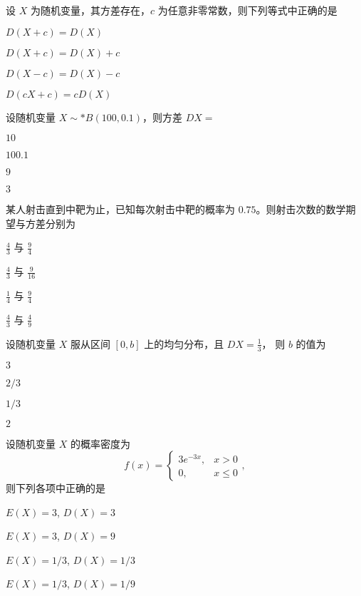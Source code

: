 \documentclass{exam-zh}
\begin{document}
\begin{question}
  设 $X$ 为随机变量，其方差存在，$c$ 为任意非零常数，则下列等式中正确的是 \paren[A]
  \begin{choices}
    \item $D(X+c) = D(X)$
    \item $D(X+c) = D(X)+c$
    \item $D(X-c) = D(X)-c$
    \item $D(cX+c) = cD(X)$
  \end{choices}
\end{question}

\begin{question}
  设随机变量 $X \sim* B(100,0.1)$，则方差 $DX =$ \paren[C]
  \begin{choices}
    \item $10$
    \item $100.1$
    \item $9$
    \item $3$
  \end{choices}
\end{question}

\begin{question}
  某人射击直到中靶为止，已知每次射击中靶的概率为 $0.75$。则射击次数的数学期望与方差分别为 \paren[A]
  \begin{choices}
    \item $\frac{4}{3}$ 与 $\frac{9}{4}$
    \item $\frac{4}{3}$ 与 $\frac{9}{16}$
    \item $\frac{1}{4}$ 与 $\frac{9}{4}$
    \item $\frac{4}{3}$ 与 $\frac{4}{9}$
  \end{choices}
\end{question}

\begin{question}
  设随机变量 $X$ 服从区间 $[0, b]$ 上的均匀分布，且
  $DX = \frac{1}{3} $，
  则 $b$ 的值为 \paren[D]
  \begin{choices}
    \item $3$
    \item $2/3$
    \item $1/3$
    \item $2$
  \end{choices}
\end{question}

\begin{question}
  设随机变量 $X$ 的概率密度为
  $$
  f(x) = 
  \begin{cases} 
  3e^{-3x}, & x > 0 \\ 
  0, & x \leq 0 
  \end{cases},
  $$
  则下列各项中正确的是 \paren[D]
  \begin{choices}
    \item $E(X) = 3$, $D(X) = 3$
    \item $E(X) = 3$, $D(X) = 9$
    \item $E(X) = 1/3$, $D(X) = 1/3$
    \item $E(X) = 1/3$, $D(X) = 1/9$
  \end{choices}
\end{question}
\end{document}
